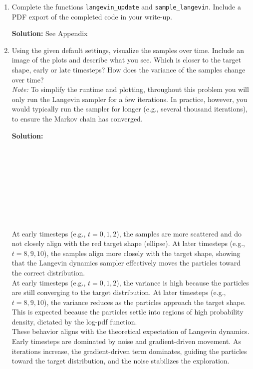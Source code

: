 \documentclass{article}
\newenvironment{solution}{\color{blue} \smallskip \textbf{Solution:}}{}
\begin{document}
\begin{enumerate}
    \item 
    Complete the functions \texttt{langevin\_update} and \texttt{sample\_langevin}. Include a PDF export of the completed code in your write-up.

    \begin{solution}
       See Appendix
    \end{solution}

    \item
    Using the given default settings, visualize the samples over time. 
    Include an image of the plots and describe what you see. 
    Which is closer to the target shape, early or late timesteps? 
    How does the variance of the samples change over time? \\
    \textit{Note:} To simplify the runtime and plotting, throughout this problem you will only run the Langevin sampler for a few iterations. 
    In practice, however, you would typically run the sampler for longer (e.g., several thousand iterations), to ensure the Markov chain has converged.

    \begin{solution}\\\\\\\\\\\\\\\\\\\\

At early timesteps (e.g., \( t = 0, 1, 2 \)), the samples are more scattered and do not closely align with the red target shape (ellipse).  At later timesteps (e.g., \( t = 8, 9, 10 \)), the samples align more closely with the target shape, showing that the Langevin dynamics sampler effectively moves the particles toward the correct distribution.\\

At early timesteps (e.g., \( t = 0, 1, 2 \)), the variance is high because the particles are still converging to the target distribution.  At later timesteps (e.g., \( t = 8, 9, 10 \)), the variance reduces as the particles approach the target shape. This is expected because the particles settle into regions of high probability density, dictated by the log-pdf function.\\

These behavior aligns with the theoretical expectation of Langevin dynamics. Early timesteps are dominated by noise and gradient-driven movement. As iterations increase, the gradient-driven term dominates, guiding the particles toward the target distribution, and the noise stabilizes the exploration.\\




\end{solution}
\end{enumerate}
\end{document}
